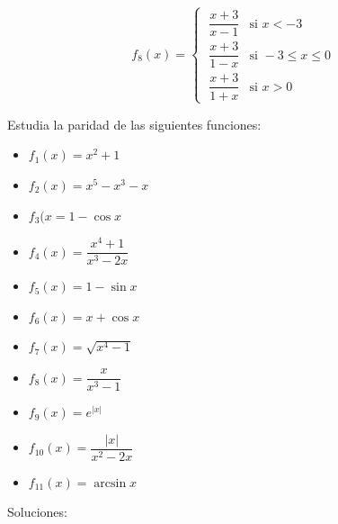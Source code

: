 {\begin{proofw}
\begin{itemize}
\begin{multicols}{2}
				\begin{equation*}
					f_8(x)=
					\begin{cases} 
					\;  \dfrac {x+3}{x-1} &\mbox{si } x<-3 \\ 
					\; \dfrac {x+3}{1-x} &\mbox{si } -3\le x \le 0 \\
					\; \dfrac {x+3}{1+x} & \mbox{si } x>0 
					\end{cases}
				\end{equation*}
				
				\end{multicols}
		
		
		\end{itemize}
		
			
		\end{proofw}
		
		
		\begin{ejre}
		Estudia la paridad de las siguientes funciones:
		
		\begin{multicols}{2} 
			\begin{itemize}
			\item $f_1(x)=x^2+1$
			\item $f_2(x)=x^5-x^3-x$
			\item $f_3(x=1-\cos x$
			\item $f_4(x)=\dfrac {x^4+1}{x^3-2x}$
			\item $f_5(x)=1-\sin x$
			\item $f_6(x)=x+\cos x$
			\item $f_7(x)=\sqrt{x^4-1}$
			\item $f_8(x)=\dfrac {x}{x^3-1}$
			\item $f_9(x)=e^{|x|}$
			\item $f_{10}(x)=\dfrac {|x|}{x^2-2x}$
			\item $f_{11}(x)=\arcsin x$
			\end{itemize}
			\end{multicols}
		
		\end{ejre}
		
		\begin{proofw}\renewcommand{\qedsymbol}{$\diamond$}	

		Soluciones:
		
		\begin{itemize}
		

\end{itemize}
\end{proofw}}
